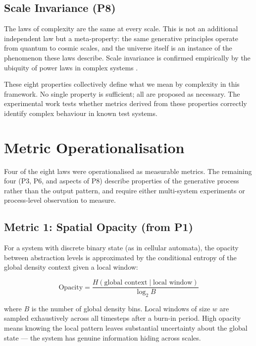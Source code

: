 \documentclass[12pt,a4paper]{article}
\begin{document}
\subsection{Scale Invariance (P8)}

The laws of complexity are the same at every scale.
This is not an additional independent law but a meta-property:
the same generative principles operate from quantum to cosmic scales,
and the universe itself is an instance of the phenomenon these laws
describe.
Scale invariance is confirmed empirically by the ubiquity of power laws
in complex systems \citep{bak1987}.

\bigskip

These eight properties collectively define what we mean by complexity
in this framework.
No single property is sufficient; all are proposed as necessary.
The experimental work tests whether metrics derived from these
properties correctly identify complex behaviour in known test systems.

\section{Metric Operationalisation}

Four of the eight laws were operationalised as measurable metrics.
The remaining four (P3, P6, and aspects of P8) describe properties
of the generative process rather than the output pattern, and require
either multi-system experiments or process-level observation to measure.

\subsection{Metric 1: Spatial Opacity (from P1)}

For a system with discrete binary state (as in cellular automata), the
opacity between abstraction levels is approximated by the conditional
entropy of the global density context given a local window:

\begin{equation}
\text{Opacity} = \frac{H(\text{global context} \mid \text{local window})}{\log_2 B}
\end{equation}

where $B$ is the number of global density bins.
Local windows of size $w$ are sampled exhaustively across all timesteps
after a burn-in period.
High opacity means knowing the local pattern leaves substantial
uncertainty about the global state — the system has genuine information
hiding across scales.
\end{document}

